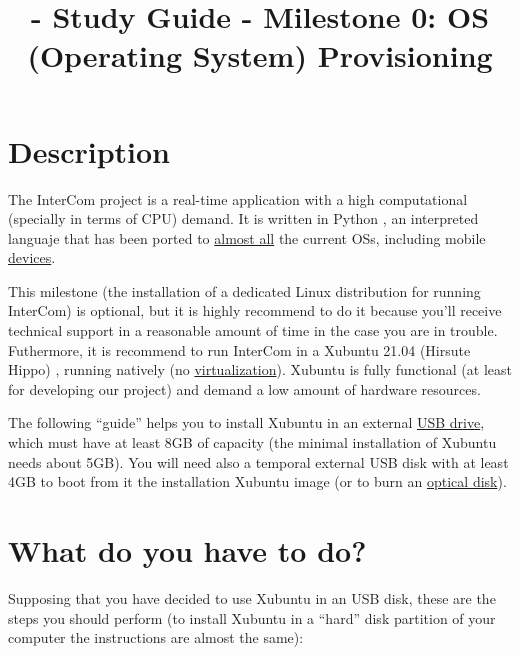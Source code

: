 
\title{\TM{} - Study Guide - Milestone 0: OS (Operating System) Provisioning}

\maketitle

\section{Description}

The InterCom project \cite{intercom} is a real-time application with
a high computational (specially in terms of CPU) demand. It is written
in Python \cite{python}, an interpreted languaje that has been
ported to \href{https://www.python.org/download/other/}{almost all}
the current OSs, including
mobile \href{https://kivy.org/#home}{devices}.

This milestone (the installation of a dedicated Linux distribution for
running InterCom) is optional, but it is highly recommend to do it
because you'll receive technical support in a reasonable amount of
time in the case you are in trouble. Futhermore, it is recommend to
run InterCom in a Xubuntu 21.04 (Hirsute Hippo) \cite{xubuntu},
running natively
(no \href{https://en.wikipedia.org/wiki/Virtualization}{virtualization}). Xubuntu
is fully functional (at least for developing our project) and demand a
low amount of hardware resources.

The following ``guide'' helps you to install Xubuntu in an
external \href{https://en.wikipedia.org/wiki/USB_flash_drive}{USB
drive}, which must have at least 8GB of capacity (the minimal
installation of Xubuntu needs about 5GB). You will need also a
temporal external USB disk with at least 4GB to boot from it the
installation Xubuntu image (or to burn
an \href{https://en.wikipedia.org/wiki/Optical_disc}{optical disk}).

\section{What do you have to do?}

Supposing that you have decided to use Xubuntu in an USB disk,
these are the steps you should perform (to install Xubuntu in a ``hard'' disk
partition of your computer the instructions are almost the same):

